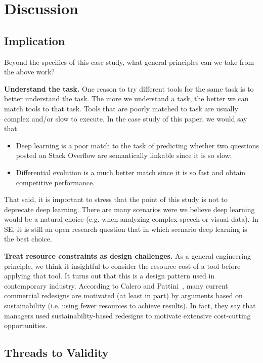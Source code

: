 \documentclass[sigconf,review, anonymous]{acmart}
\theoremstyle{break}
\newcommand{\bi}{\begin{itemize}[leftmargin=0.4cm]}
\newcommand{\ei}{\end{itemize}}
\begin{document}
\section{Discussion}\label{discussion}
 
\subsection{Implication}

Beyond the specifics of this case study, what general principles
can we take from the above work?

\textbf{Understand the task.}
One reason to try different tools for the same task is to better
understand the task.
The more we understand a task, the better we can match tools to that task. Tools that are poorly matched to task are usually complex and/or slow to execute.  In the case study of this paper, we would say that

\bi
\item
Deep learning is a poor match to the task of predicting whether two questions posted on Stack Overflow are semantically linkable
since it is so slow;
\item
Differential evolution is a much better match since it is so fast and obtain competitive performance.
\ei
That said, 
it  is important to stress that the point of this study
is not to deprecate deep learning.  
There are many scenarios were we
 believe  deep learning would be a natural
 choice (e.g. when analyzing complex speech or visual data). 
 In SE, it is still an open research question that in which scenario deep learning
 is the best choice.





\textbf{Treat resource constraints as design challenges.}
As a general engineering principle,
we think it insightful to consider the resource cost
of a tool before applying that tool.
It turns out that this is a design pattern used in contemporary industry.
According to Calero and Pattini~\cite{calero2015green},  many current commercial  redesigns are motivated (at least in part) by arguments based on sustainability (i.e. using fewer resources to achieve results).
In fact, they say that managers used sustainability-based redesigns to 
motivate extensive cost-cutting opportunities. 

 


 
\subsection{Threads to Validity}
\end{document}

